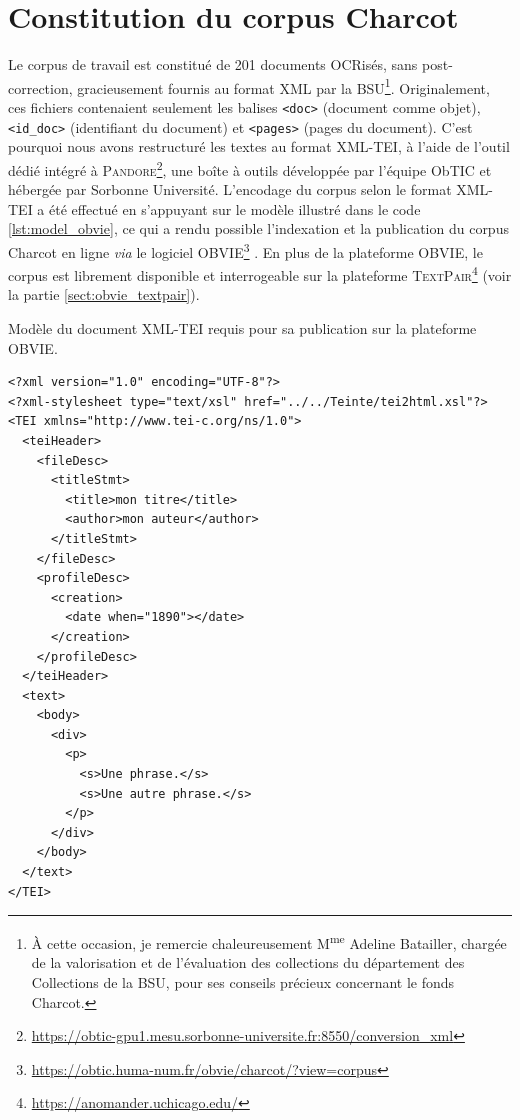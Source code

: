 \section{Constitution du corpus Charcot}
Le corpus de travail est constitué de 201 documents OCRisés, sans post-correction, gracieusement fournis au format \textsc{XML} par la \textsc{BSU}\footnote{À cette occasion, je remercie chaleureusement M\textsuperscript{me} Adeline Batailler, chargée de la valorisation et de l'évaluation des collections du département des Collections de la \textsc{BSU}, pour ses conseils précieux concernant le fonds Charcot.}. Originalement, ces fichiers contenaient seulement les balises \texttt{<doc>} (document comme objet), \texttt{<id\_doc>} (identifiant du document) et \texttt{<pages>} (pages du document). C'est pourquoi nous avons restructuré les textes au format \textsc{XML-TEI}, à l'aide de l’outil dédié intégré à \textsc{Pandore}\footnote{\url{https://obtic-gpu1.mesu.sorbonne-universite.fr:8550/conversion_xml}}, une boîte à outils développée par l'équipe ObTIC et hébergée par Sorbonne Université. L'encodage du corpus selon le format \textsc{XML-TEI} a été effectué en s'appuyant sur le modèle illustré dans le code \ref{lst:model_obvie}, ce qui a rendu possible l'indexation et la publication du corpus Charcot en ligne \textit{via} le logiciel \textsc{OBVIE}\footnote{\url{https://obtic.huma-num.fr/obvie/charcot/?view=corpus}} \citep{alrahabi2022obvie}. En plus de la plateforme \textsc{OBVIE}, le corpus est librement disponible et interrogeable sur la plateforme \textsc{TextPair}\footnote{\url{https://anomander.uchicago.edu/}} (voir la partie \ref{sect:obvie_textpair}).
\begin{listing}[h]
	\caption{Modèle du document \textsc{XML-TEI} requis pour sa publication sur la plateforme \textsc{OBVIE}.}
	\label{lst:model_obvie}
\begin{verbatim}
<?xml version="1.0" encoding="UTF-8"?>
<?xml-stylesheet type="text/xsl" href="../../Teinte/tei2html.xsl"?>
<TEI xmlns="http://www.tei-c.org/ns/1.0">
  <teiHeader>
    <fileDesc>
      <titleStmt>
        <title>mon titre</title>
        <author>mon auteur</author>
      </titleStmt>
    </fileDesc>
    <profileDesc>
      <creation>
        <date when="1890"></date>
      </creation>
    </profileDesc>
  </teiHeader>
  <text>
    <body>
      <div>
        <p>
          <s>Une phrase.</s>
          <s>Une autre phrase.</s>
        </p>
      </div>
    </body>
  </text>
</TEI>
\end{verbatim}
\end{listing}


